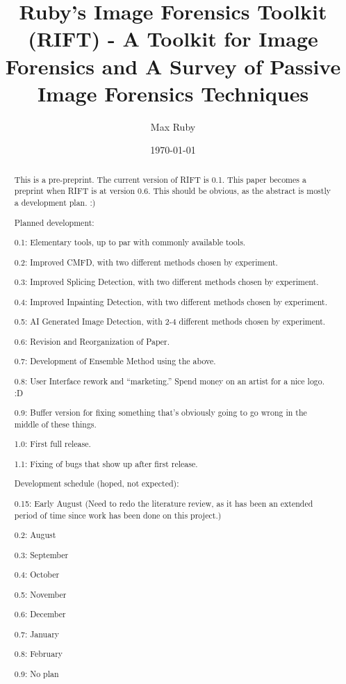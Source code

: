 \documentclass[compsoc]{IEEEtran}
\begin{document}
\title{Ruby's Image Forensics Toolkit (RIFT) - A Toolkit for Image Forensics and A Survey of Passive Image Forensics Techniques}
\author{Max Ruby}

\date{\today}
\maketitle
\begin{abstract}
This is a pre-preprint. The current version of RIFT is 0.1. This paper becomes a preprint when RIFT is at version 0.6. This should be obvious, as the abstract is mostly a development plan. :)

Planned development:

0.1: Elementary tools, up to par with commonly available tools.

0.2: Improved CMFD, with two different methods chosen by experiment.

0.3: Improved Splicing Detection, with two different methods chosen by experiment.

0.4: Improved Inpainting Detection, with two different methods chosen by experiment.

0.5: AI Generated Image Detection, with 2-4 different methods chosen by experiment.

0.6: Revision and Reorganization of Paper.

0.7: Development of Ensemble Method using the above.

0.8: User Interface rework and ``marketing.'' Spend money on an artist for a nice logo. :D

0.9: Buffer version for fixing something that's obviously going to go wrong in the middle of these things.

1.0: First full release.

1.1: Fixing of bugs that show up after first release.

Development schedule (hoped, not expected):

0.15: Early August (Need to redo the literature review, as it has been an extended period of time since work has been done on this project.)

0.2: August

0.3: September

0.4: October

0.5: November

0.6: December

0.7: January

0.8: February

0.9: No plan


\end{abstract}
\end{document}
